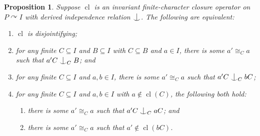 \documentclass[12pt]{amsart}
\theoremstyle{plain}
\newtheorem{proposition}[theorem]{Proposition}
\theoremstyle{definition}
\newcommand{\isom}{\cong}
\DeclareMathOperator{\cl}{cl}
\newcommand{\forkindep}[1][]{%
  \mathrel{
    \mathop{
      \vcenter{
        \hbox{\oalign{\noalign{\kern-.3ex}\hfil$\vert$\hfil\cr
              \noalign{\kern-.7ex}
              $\smile$\cr\noalign{\kern-.3ex}}}
      }
    }\displaylimits_{#1}
  }
}
\begin{document}
\begin{proposition}\label{prop:cl_equivalence}
Suppose $\cl$ is an invariant finite-character closure operator on $P \curvearrowright I$ with derived independence relation $\forkindep$. The following are equivalent:
\begin{enumerate}
    \item $\cl$ is disjointifying;
    \item for any finite $C \subseteq I$ and $B \subseteq I$ with $C \subseteq B$ and $a \in I$, there is some $a' \isom_C a$ such that $a'C \forkindep[C] B$; and
    \item for any finite $C \subseteq I$ and $a, b \in I$, there is some $a' \isom_C a$ such that $a'C \forkindep[C] bC$;
    \item for any finite $C \subseteq I$ and $a, b \in I$ with $a \not\in \cl(C)$, the following both hold:
    \begin{enumerate}
        \item there is some $a' \isom_C a$ such that $a'C \forkindep[C] aC$; and
        \item there is some $a' \isom_C a$ such that $a' \not\in \cl(bC)$.
    \end{enumerate}
\end{enumerate}

\end{proposition}
\end{document}

